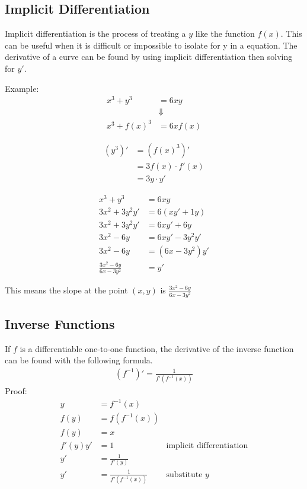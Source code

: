 \documentclass{article}
\theoremstyle{mytheoremstyle}
\theoremstyle{mytheoremstyle}
\theoremstyle{myproblemstyle}
\begin{document}
    \subsection*{Implicit Differentiation}
    Implicit differentiation is the process of treating a $y$ like the function
    $f(x)$. This can be useful when it is difficult or impossible to isolate for
    y in a equation. The derivative of a curve can be found by using implicit
    differentiation then solving for $y'$.

    Example:
    \begin{align*}
        x^3+y^3&=6xy \\
               &\Downarrow \\
        x^3+f(x)^3 &= 6xf(x)
    \end{align*}

    \begin{align*}
        (y^3)' &= (f(x)^3)' \\
        &= 3f(x) \cdot f'(x) \\
        &= 3y \cdot y'
    \end{align*}

    \begin{align*}
        x^3+y^3                 &= 6xy \\
        3x^2 + 3y^2y'           &= 6(xy'+1y) \\
        3x^2+3y^2y'             &= 6xy'+6y \\
        3x^2-6y                 &= 6xy'-3y^2y' \\
        3x^2-6y                 &= (6x-3y^2)y' \\
        \frac{3x^2-6y}{6x-3y^2} &= y'
    \end{align*}

    This means the slope at the point $(x,y)$ is $\frac{3x^2-6y}{6x-3y^2}$

    \subsection*{Inverse Functions}
    If $f$ is a differentiable one-to-one function, the derivative of the
    inverse function can be found with the following formula.
    \begin{align*}
        (f^{-1})' = \frac{1}{f'(f^{-1}(x))}
    \end{align*}
    Proof:
    \begin{align*}
        y &= f^{-1}(x) \\
        f(y) &= f(f^{-1}(x)) \\
        f(y) &= x \\
        f'(y)y' &= 1 & \text{implicit differentiation} \\
        y' &= \frac{1}{f'(y)} \\
        y' &= \frac{1}{f'(f^{-1}(x))} & \text{substitute $y$} \\
    \end{align*}
\end{document}
